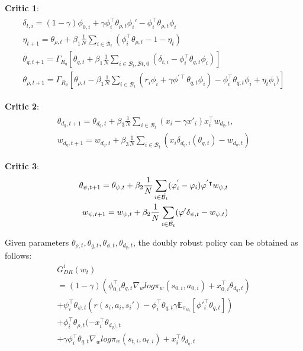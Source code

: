 \textbf{Critic 1}:
\begin{align}
    \begin{split}
        \delta_{t,i}=(1-\gamma)\phi_{0,i}+\gamma \phi_i^\intercal \theta_{\rho,t}\phi_i'-\phi_i^\intercal \theta_{\rho,t}\phi_i \\
        \eta_{t+1}=\theta_{\rho,t}+\beta_1\frac{1}{N}\sum_{i \in \mathcal{B}_t}(\phi_i^\intercal \theta_{\rho,t}-1-\eta_t)\\
        \theta_{q,t+1}=\Gamma_{R_q}[\theta_{q,t}+\beta_1 \frac{1}{N}\sum_{i \in \mathcal{B}_t, \mathcal{B}{t,0}}(\delta_{t,i}-\phi_i^\intercal \theta_{q,t}\phi_i)]\\
        \theta_{\rho,t+1}=\Gamma_{R_\rho}[\theta_{\rho,t}-\beta_1 \frac{1}{N}\sum_{i \in \mathcal{B}_t}(r_i \phi_i +\gamma \phi^{'\intercal}\theta_{q,t}\phi_i)-\phi_i^\intercal \theta_{q,t}\phi_i+\eta_t\phi_i)]
    \end{split}
\end{align}

\textbf{Critic 2}:
\begin{align}
    \begin{split}
        \theta_{d_q, t+1}=\theta_{d_q,t}+\beta_3 \frac{1}{N}\sum_{i \in \mathcal{B}_t}(x_i-\gamma x'_i)x_i^\intercal w_{d_q,t},\\
        w_{d_q,t+1}=w_{d_q,t}+ \beta_3 \frac{1}{N}\sum_{i \in \mathcal{B}_t}(x_i\delta_{d_q,i}(\theta_{q,t})-w_{d_q,t})
    \end{split}
\end{align}

\textbf{Critic 3}:
\begin{align}
    \begin{split}
        \theta_{\psi,t+1}=\theta_{\psi,t}+\beta_2 \frac{1}{N}\sum_{i \in \Tilde{\mathcal{B}_t}}
        (\varphi_i^{'}-\varphi_i)\varphi^{'\intercal} w_{\psi,t}\\
        w_{\psi,t+1}=w_{\psi,t}+\beta_2 \frac{1}{N}\sum_{i \in \Tilde{\mathcal{B}_t}}(\varphi'\delta_{\psi,t}-w_{\psi,t})
    \end{split}
\end{align}

 Given parameters $\theta_{\rho,t}, \theta_{q,t}, \theta_{\phi,t}, \theta_{d_q,t}$, the doubly robust policy can be obtained as follows:
\begin{multline*}
    G_{DR}^i(w_t)\\
        =(1-\gamma)(\phi_{0,i}^\intercal \theta_{q,t} \nabla_w log \pi_w(s_{0,i},a_{0,i})+x_{0,i}^\intercal\theta_{d_q,t})\\
        +\psi_i^\intercal \theta_{\psi,t}(r(s_i,a_i,s_i')-\phi_i^\intercal \theta_{q,t}\gamma \mathbb{E}_{\pi_{w_t}}[\phi'_i^\intercal\theta_{q,t}])\\
        +\phi_i^\intercal \theta_{\rho,t}(-x_i^\intercal \theta_{d_q),t}\\
        +\gamma \phi_i^\intercal \theta_{q,t} \nabla_w log \pi_w(s_{t,i},a_{t,i})+x_i^\intercal \theta_{d_q,t}
\end{multline*}



        

